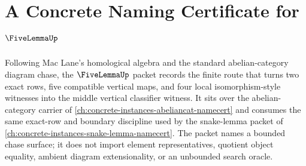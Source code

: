 \chapter{A Concrete Naming Certificate for $\FiveLemmaUp$}
\label{ch:concrete-instances-five-lemma-namecert}

Following Mac Lane's homological algebra and the standard abelian-category
diagram chase, the $\FiveLemmaUp$ packet records the finite route that turns two
exact rows, five compatible vertical maps, and four local isomorphism-style
witnesses into the middle vertical classifier witness. It sits over the
abelian-category carrier of
\autoref{ch:concrete-instances-abeliancat-namecert} and consumes the same
exact-row and boundary discipline used by the snake-lemma packet of
\autoref{ch:concrete-instances-snake-lemma-namecert}. The packet names a
bounded chase surface; it does not import element representatives, quotient
object equality, ambient diagram extensionality, or an unbounded search oracle.

